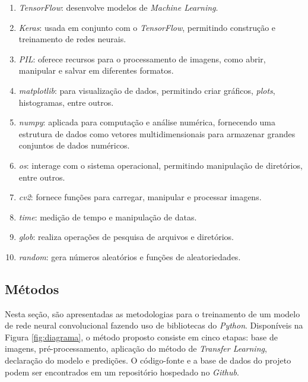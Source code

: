 \begin{enumerate}[label=\alph*)]
    \item \textit{TensorFlow}: desenvolve modelos de \textit{Machine Learning}.
    
    \item \textit{Keras}: usada em conjunto com o \textit{TensorFlow}, permitindo construção e treinamento de redes neurais.
    
    \item \textit{PIL}: oferece recursos para o processamento de imagens, como abrir, manipular e salvar em diferentes formatos.
        
    \item \textit{matplotlib}: para visualização de dados, permitindo criar gráficos, \textit{plots}, histogramas, entre outros.
    
    \item \textit{numpy}: aplicada para computação e análise numérica, fornecendo uma estrutura de dados como vetores multidimensionais para armazenar grandes conjuntos de dados numéricos.

    \item \textit{os}: interage com o sistema operacional, permitindo manipulação de diretórios, entre outros.

    \item \textit{cv2}: fornece funções para carregar, manipular e processar imagens.

    \item \textit{time}: medição de tempo e manipulação de datas.

    \item \textit{glob}: realiza operações de pesquisa de arquivos e diretórios.

    \item \textit{random}: gera números aleatórios e funções de aleatoriedades.
\end{enumerate}




\subsection{\esp Métodos} \label{metodos}

Nesta seção, são apresentadas as metodologias para o treinamento de um modelo de rede neural convolucional fazendo uso de bibliotecas do \textit{Python}. Disponíveis na Figura \ref{fig:diagrama}, o método proposto consiste em cinco etapas: base de imagens, pré-processamento, aplicação do método de \textit{Transfer Learning}, declaração do modelo e predições. O código-fonte e a base de dados do projeto podem ser encontrados em um repositório hospedado no \textit{Github}.

